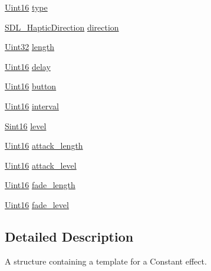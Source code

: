 \begin{DoxyCompactItemize}
\item 
\hyperlink{_s_d_l__stdinc_8h_a31fcc0a076c9068668173ee26d33e42b}{Uint16} \hyperlink{struct_s_d_l___haptic_constant_a5cb31202803a8bc1be95fcede5ac8afb}{type}
\item 
\hyperlink{struct_s_d_l___haptic_direction}{S\-D\-L\-\_\-\-Haptic\-Direction} \hyperlink{struct_s_d_l___haptic_constant_a3e871debf4e57c35960f019d2605d84f}{direction}
\item 
\hyperlink{_s_d_l__stdinc_8h_add440eff171ea5f55cb00c4a9ab8672d}{Uint32} \hyperlink{struct_s_d_l___haptic_constant_aeb994c356b1d236b060f277d157e98ec}{length}
\item 
\hyperlink{_s_d_l__stdinc_8h_a31fcc0a076c9068668173ee26d33e42b}{Uint16} \hyperlink{struct_s_d_l___haptic_constant_a16a751009893f5412201e3ce91146b25}{delay}
\item 
\hyperlink{_s_d_l__stdinc_8h_a31fcc0a076c9068668173ee26d33e42b}{Uint16} \hyperlink{struct_s_d_l___haptic_constant_aa65321f1b002adaab6e629d5bed556e9}{button}
\item 
\hyperlink{_s_d_l__stdinc_8h_a31fcc0a076c9068668173ee26d33e42b}{Uint16} \hyperlink{struct_s_d_l___haptic_constant_ab1f7f0df856f4cf1fdf937cb886226b4}{interval}
\item 
\hyperlink{_s_d_l__stdinc_8h_a9d0257032c0e146ab6121bf0122712f5}{Sint16} \hyperlink{struct_s_d_l___haptic_constant_a5b095eea77464623ed57af15f29f4ca6}{level}
\item 
\hyperlink{_s_d_l__stdinc_8h_a31fcc0a076c9068668173ee26d33e42b}{Uint16} \hyperlink{struct_s_d_l___haptic_constant_a907bade68ab53fb24e7d2651d19b767f}{attack\-\_\-length}
\item 
\hyperlink{_s_d_l__stdinc_8h_a31fcc0a076c9068668173ee26d33e42b}{Uint16} \hyperlink{struct_s_d_l___haptic_constant_a0928a37f3fab0e5b7daffc7a1d65744c}{attack\-\_\-level}
\item 
\hyperlink{_s_d_l__stdinc_8h_a31fcc0a076c9068668173ee26d33e42b}{Uint16} \hyperlink{struct_s_d_l___haptic_constant_a647a6b761ac6ba16160d0892a12806bc}{fade\-\_\-length}
\item 
\hyperlink{_s_d_l__stdinc_8h_a31fcc0a076c9068668173ee26d33e42b}{Uint16} \hyperlink{struct_s_d_l___haptic_constant_a49f6499c89f3e494efbe92f12277c949}{fade\-\_\-level}
\end{DoxyCompactItemize}


\subsection{Detailed Description}
A structure containing a template for a Constant effect. 

